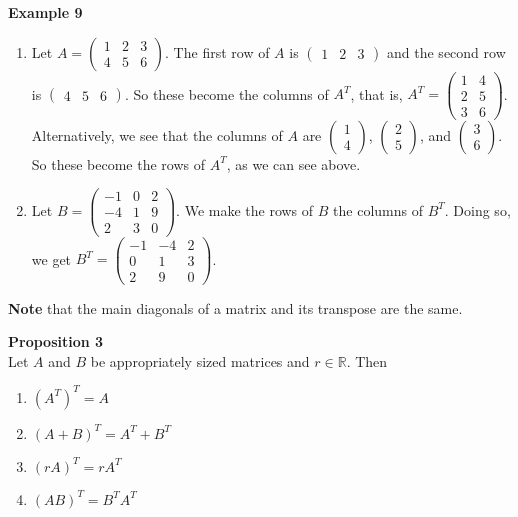 \documentclass[12pt]{article}
\def\it{\item}
\def\be{\begin{enumerate}} \def\ee{\end{enumerate}}
\def\R{\mathbb{R}} \def\Q{\mathbb{Q}} \def\N{\mathbb{N}} \def\Z{\mathbb{Z}} \def\P{\mathbb{P}}
\begin{document}
\noindent
{\bf Example 9}
\be
\it Let $A = \begin{pmatrix} 1 & 2 & 3 \\ 4 & 5 & 6 \end{pmatrix}$. The first row of $A$ is $\begin{pmatrix} 1 & 2 & 3 \end{pmatrix}$ and the second row is $\begin{pmatrix} 4 & 5 & 6 \end{pmatrix}$. So these become the columns of $A^T$, that is, $A^T = \begin{pmatrix} 1 & 4 \\ 2 & 5 \\ 3 & 6 \end{pmatrix}$. Alternatively, we see that the columns of $A$ are $\begin{pmatrix} 1 \\ 4 \end{pmatrix}$, $\begin{pmatrix} 2 \\ 5 \end{pmatrix}$, and $\begin{pmatrix} 3 \\ 6 \end{pmatrix}$. So these become the rows of $A^T$, as we can see above.
\it Let $B = \begin{pmatrix} -1 & 0 & 2 \\ -4 & 1 & 9 \\ 2 & 3 & 0 \end{pmatrix}$. We make the rows of $B$ the columns of $B^T$. Doing so, we get
$B^T = \begin{pmatrix} -1 & -4 & 2 \\ 0 & 1 & 3 \\ 2 & 9 & 0 \end{pmatrix}$.
\ee

{\bf Note} that the main diagonals of a matrix and its transpose are the same.

\noindent
{\bf Proposition 3} \\
Let $A$ and $B$ be appropriately sized matrices and $r \in \R$. Then
\be
\it $(A^T)^T = A$
\it $(A + B)^T = A^T + B^T$
\it $(rA)^T = rA^T$
\it $(AB)^T = B^T A^T$
\ee
\end{document}
